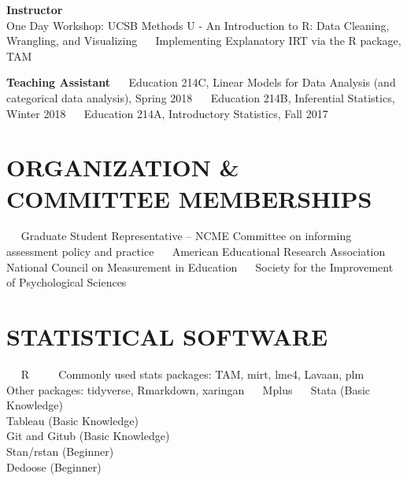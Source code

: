 \documentclass[11pt,]{article}
\begin{document}
\textbf{Instructor}\\
\hspace*{0.333em}\hspace*{0.333em} One Day Workshop: UCSB Methods U - An
Introduction to R: Data Cleaning, Wrangling, and Visualizing ~~
Implementing Explanatory IRT via the R package, TAM

\textbf{Teaching Assistant} ~~ Education 214C, Linear Models for Data
Analysis (and categorical data analysis), Spring 2018 ~~ Education 214B,
Inferential Statistics, Winter 2018 ~~ Education 214A, Introductory
Statistics, Fall 2017

\hypertarget{organization-committee-memberships}{%
\section{ORGANIZATION \& COMMITTEE
MEMBERSHIPS}\label{organization-committee-memberships}}

~~ Graduate Student Representative -- NCME Committee on informing
assessment policy and practice ~~ American Educational Research
Association ~~ National Council on Measurement in Education ~~ Society
for the Improvement of Psychological Sciences

\hypertarget{statistical-software}{%
\section{STATISTICAL SOFTWARE}\label{statistical-software}}

~~ R ~~~~ Commonly used stats packages: TAM, mirt, lme4, Lavaan, plm
~~~~ Other packages: tidyverse, Rmarkdown, xaringan ~~ Mplus ~~ Stata
(Basic Knowledge)\\
\hspace*{0.333em}\hspace*{0.333em} Tableau (Basic Knowledge)\\
\hspace*{0.333em}\hspace*{0.333em} Git and Gitub (Basic Knowledge)\\
\hspace*{0.333em}\hspace*{0.333em} Stan/rstan (Beginner)\\
\hspace*{0.333em}\hspace*{0.333em} Dedoose (Beginner)
\end{document}
